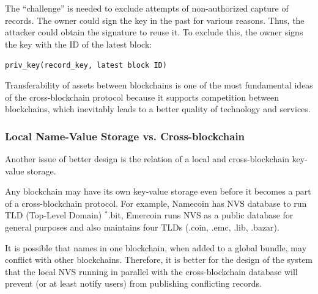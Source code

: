 \begin{multicols}{2}
\vspace{-.15cm}

The “challenge” is needed to exclude attempts of non-authorized capture of records. The owner could sign the key in the past for various reasons. Thus, the attacker could obtain the signature to reuse it. To exclude this, the owner signs the key with the ID of the latest block:

\vspace{-.4cm}

\begin{center}
\texttt{priv\_key(record\_key, latest block ID)}
\end{center}

\vspace{-.45cm}

Transferability of assets between blockchains is one of the most fundamental ideas of the cross-blockchain protocol because it supports competition between blockchains, which inevitably leads to a better quality of technology and services.

\vspace{-.6cm}

\subsubsection{Local Name-Value Storage vs. Cross-blockchain}\label{subsubsec-4.2.f}

\vspace{-.3cm}

Another issue of better design is the relation of a local and cross-blockchain key-value storage.

\vspace{-.1cm}

Any blockchain may have its own key-value storage even before it becomes a part of a cross-blockchain protocol. For example, Namecoin has NVS database to run TLD (Top-Level Domain) $^\ast$.bit, Emercoin runs NVS as a public database for general purposes and also maintains four TLDs (.coin, .emc, .lib, .bazar).

\vspace{-.1cm}

It is possible that names in one blockchain, when added to a global bundle, may conflict with other blockchains. Therefore, it is better for the design of the system that the local NVS running in parallel with the cross-blockchain database will prevent (or at least notify users) from publishing conflicting records.


\end{multicols}
